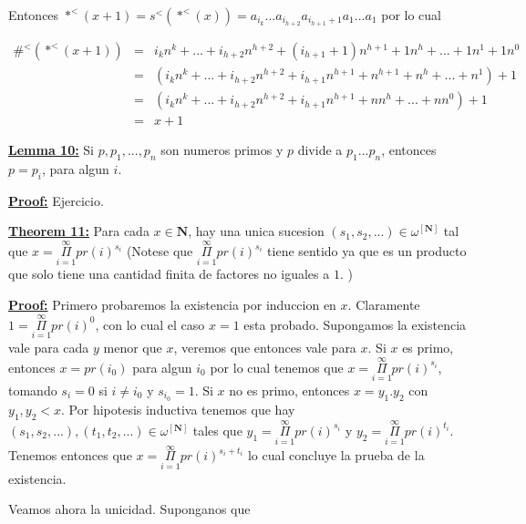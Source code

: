     Entonces $\ast^{<}(x+1)=s^{<}(\ast^{<}(x))=a_{i_{k}}...a_{i_{h+2}}a_{i_{h+1}+1}a_{1}...a_{1}$ por lo cual

    \begin{eqnarray}
      \nonumber \#^{<}(\ast^{<}(x+1)) &=& i_{k}n^{k}+...+i_{h+2}n^{h+2}+(i_{h+1}+1)n^{h+1}+1n^{h}+...+1n^{1}+1n^{0} \\
      \nonumber &=& \left( i_{k}n^{k}+...+i_{h+2}n^{h+2}+i_{h+1}n^{h+1}+n^{h+1}+n^{h}+...+n^{1}\right) +1 \\
      \nonumber &=& \left( i_{k}n^{k}+...+i_{h+2}n^{h+2}+i_{h+1}n^{h+1}+nn^{h}+...+nn^{0}\right) +1 \\
      \nonumber &=& x + 1
    \end{eqnarray}

  \QED


  \textbf{\underline{Lemma 10:}} Si $p, p_{1},...,p_{n}$ son numeros primos y $p$ divide a $p_{1}...p_{n}$, entonces $p=p_{i}$, para algun $i$.

  \textbf{\underline{Proof:}} Ejercicio.

  \QED


  \textbf{\underline{Theorem 11:}} Para cada $x\in \mathbf{N}$, hay una unica sucesion $(s_{1},s_{2},...)\in \omega ^{\left[ \mathbf{N}\right] }$ tal que
    $\displaystyle x=\underset{i=1}{\overset{\infty }{\Pi }}pr(i)^{s_{i}} $
    (Notese que $\underset{i=1}{\overset{\infty }{\Pi }}pr(i)^{s_{i}}$ tiene sentido ya que es un producto que solo tiene una cantidad finita de factores no iguales a $1$. )

  \textbf{\underline{Proof:}} Primero probaremos la existencia por induccion en $x$. Claramente $1= \underset{i=1}{\overset{\infty }{\Pi }}pr(i)^{0}$, con lo cual el caso $x=1$ esta probado. Supongamos la existencia vale para cada $y$ menor que $x$, veremos que entonces vale para $x$. Si $x$ es primo, entonces $x=pr(i_{0})$ para algun $i_{0}$ por lo cual tenemos que $x=\underset{i=1}{\overset{\infty }{\Pi }}pr(i)^{s_{i}}$, tomando $s_{i}=0$ si $i\neq i_{0}$ y $s_{i_{0}}=1$. Si $x$ no es primo,
    entonces $x=y_{1}.y_{2}$ con $y_{1},y_{2}< x$. Por hipotesis inductiva tenemos que hay $(s_{1},s_{2},...),(t_{1},t_{2},...)\in \omega ^{\left[ \mathbf{N}\right] }$ tales que $y_{1}=\underset{i=1}{\overset {\infty }{\Pi }}pr(i)^{s_{i}}$ y $y_{2}=\underset{i=1}{\overset{\infty }{\Pi }}pr(i)^{t_{i}}$. Tenemos entonces que $x=\underset{i=1}{\overset{\infty }{ \Pi }}pr(i)^{s_{i}+t_{i}}$ lo cual concluye la prueba de la existencia.

    Veamos ahora la unicidad. Suponganos que

